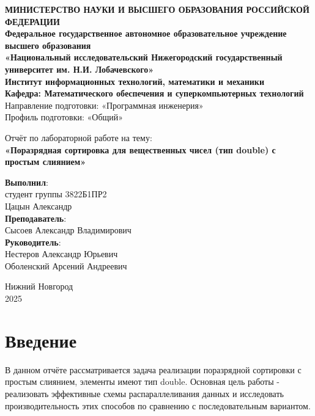 \documentclass[a4paper,12pt]{article}
\begin{document}
\begin{titlepage}
\begin{center}
\textbf{МИНИСТЕРСТВО НАУКИ И ВЫСШЕГО ОБРАЗОВАНИЯ РОССИЙСКОЙ ФЕДЕРАЦИИ} \\
\textbf{Федеральное государственное автономное образовательное учреждение высшего образования} \\
\textbf{«Национальный исследовательский Нижегородский государственный университет им. Н.И. Лобачевского»} \\[1cm]
\textbf{Институт информационных технологий, математики и механики }\\[0.5cm]
\textbf{Кафедра: Математического обеспечения и суперкомпьютерных технологий}\\[0.5cm]
Направление подготовки: «Программная инженерия»\\
Профиль подготовки: «Общий»\\

\vfill

Отчёт по лабораторной работе на тему:\\
{\Large
\textbf{«Поразрядная сортировка для вещественных чисел (тип double) с простым слиянием»} \\
}
\vfill
\begin{flushright}
\textbf{Выполнил}:\\
студент группы 3822Б1ПР2 \\
Цацын Александр \\
\vspace{1cm}
\textbf{Преподаватель}: \\
Сысоев Александр Владимирович \\
\textbf{Руководитель}: \\
Нестеров Александр Юрьевич\\
Оболенский Арсений Андреевич\\
\end{flushright}
\vfill
Нижний Новгород \\
2025
\end{center}
\end{titlepage}



\tableofcontents
\newpage


\section{Введение}
В данном отчёте рассматривается задача реализации поразрядной сортировки с простым слиянием, элементы имеют тип double. Основная цель работы - реализовать эффективные схемы распараллеливания данных и исследовать производительность этих способов по сравнению с последовательным вариантом.
\newpage
\end{document}
